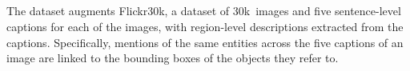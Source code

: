 
\subsection{\flickr}

The \flickr dataset \cite{plummer2015flickr30kentities}
augments Flickr30k, a dataset of 30k~images and five sentence-level captions for each of the images, with region-level descriptions extracted from the captions.
Specifically, mentions of the same entities across the five captions of an image are linked to the bounding boxes of the objects they refer to.

